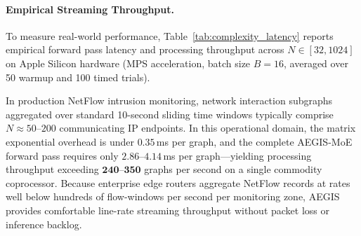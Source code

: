 \documentclass[10pt,twocolumn,letterpaper]{article}
\begin{document}
\begin{table}[t]
\centering
\caption{Empirical Latency and Forward Throughput Scaling Across Graph Vertex Scale $N \in [32, 1024]$ (Batch Size $B=16$ on Apple Silicon MPS)}
\label{tab:complexity_latency}
\small
{}
\end{table}

\paragraph{Empirical Streaming Throughput.}
To measure real-world performance, Table~\ref{tab:complexity_latency} reports empirical forward pass latency and processing throughput across $N \in [32, 1024]$ on Apple Silicon hardware (MPS acceleration, batch size $B=16$, averaged over 50 warmup and 100 timed trials). 

In production NetFlow intrusion monitoring, network interaction subgraphs aggregated over standard 10-second sliding time windows typically comprise $N \approx 50\text{--}200$ communicating IP endpoints. In this operational domain, the matrix exponential overhead is under $0.35$\,ms per graph, and the complete AEGIS-MoE forward pass requires only $2.86\text{--}4.14$\,ms per graph—yielding processing throughput exceeding $\mathbf{240\text{--}350}$ graphs per second on a single commodity coprocessor. Because enterprise edge routers aggregate NetFlow records at rates well below hundreds of flow-windows per second per monitoring zone, AEGIS provides comfortable line-rate streaming throughput without packet loss or inference backlog.
\end{document}
